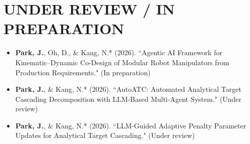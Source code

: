 \documentclass[a4paper,10pt]{article}
\begin{document}
\section*{UNDER REVIEW / IN PREPARATION}
\begin{itemize}[left=0pt]
    \item \textbf{Park, J.}, Oh, D., \& Kang, N.* (2026). “Agentic AI Framework for Kinematic--Dynamic Co-Design of Modular Robot Manipulators from Production Requirements." (In preparation)

    \item \textbf{Park, J.}, \& Kang, N.* (2026). “AutoATC: Automated Analytical Target Cascading Decomposition with LLM-Based Multi-Agent System." (Under review)

    \item \textbf{Park, J.}, \& Kang, N.* (2026). “LLM-Guided Adaptive Penalty Parameter Updates for Analytical Target Cascading." (Under review)
\end{itemize}
\end{document}
